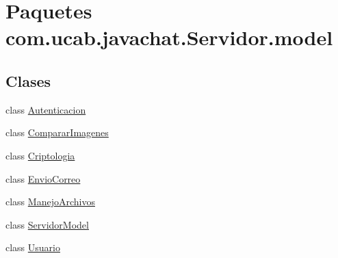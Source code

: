 \hypertarget{namespacecom_1_1ucab_1_1javachat_1_1_servidor_1_1model}{\section{Paquetes com.\-ucab.\-javachat.\-Servidor.\-model}
\label{namespacecom_1_1ucab_1_1javachat_1_1_servidor_1_1model}
}
\subsection*{Clases}
\begin{DoxyCompactItemize}
\item 
class \hyperlink{classcom_1_1ucab_1_1javachat_1_1_servidor_1_1model_1_1_autenticacion}{Autenticacion}
\item 
class \hyperlink{classcom_1_1ucab_1_1javachat_1_1_servidor_1_1model_1_1_comparar_imagenes}{Comparar\-Imagenes}
\item 
class \hyperlink{classcom_1_1ucab_1_1javachat_1_1_servidor_1_1model_1_1_criptologia}{Criptologia}
\item 
class \hyperlink{classcom_1_1ucab_1_1javachat_1_1_servidor_1_1model_1_1_envio_correo}{Envio\-Correo}
\item 
class \hyperlink{classcom_1_1ucab_1_1javachat_1_1_servidor_1_1model_1_1_manejo_archivos}{Manejo\-Archivos}
\item 
class \hyperlink{classcom_1_1ucab_1_1javachat_1_1_servidor_1_1model_1_1_servidor_model}{Servidor\-Model}
\item 
class \hyperlink{classcom_1_1ucab_1_1javachat_1_1_servidor_1_1model_1_1_usuario}{Usuario}
\end{DoxyCompactItemize}
